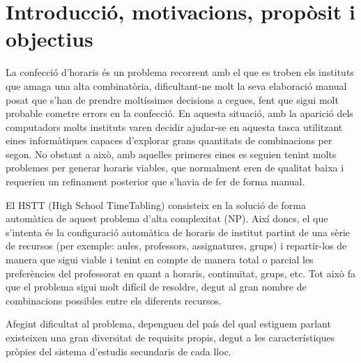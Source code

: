 \documentclass[11pt,a4paper,twoside]{report}
\begin{document}
  \shipout\null
  \tableofcontents
  
  \chapter{Introducció, motivacions, propòsit i objectius}
  

  La confecció d'horaris és un problema recorrent amb el que es troben els instituts que amaga una alta combinatòria, dificultant-ne molt la seva elaboració manual posat que s'han de prendre moltíssimes decisions a cegues,
  fent que sigui molt probable cometre errors en la confecció. En aquesta situació, amb la aparició dels computadors molts instituts varen decidir ajudar-se en aquesta tasca utilitzant eines informàtiques capaces 
  d'explorar grans quantitats de combinacions per segon. No obstant a això, amb aquelles primeres eines es seguien tenint molts problemes per generar horaris viables, que normalment eren de qualitat baixa 
  i requerien un refinament posterior que s'havia de fer de forma manual.
  
  El HSTT (High School TimeTabling) consisteix en la solució de forma automàtica de aquest problema d'alta complexitat (NP). 
  Així doncs, el que s'intenta és la configuració automàtica de horaris de institut partint de una sèrie de recursos 
  (per exemple: aules, professors, assignatures, grups) i repartir-los de manera que sigui viable i tenint en compte 
  de manera total o parcial les preferències del professorat en quant a horaris, continuïtat, grups, etc. Tot això fa que el problema sigui molt difícil de resoldre, degut al gran nombre de combinacions possibles entre els diferents recursos.
  
  Afegint dificultat al problema, depenguen del país del qual estiguem parlant existeixen una gran diversitat de requisits propis, degut a les característiques pròpies del sistema d'estudis secundaris de cada lloc.
\end{document}
